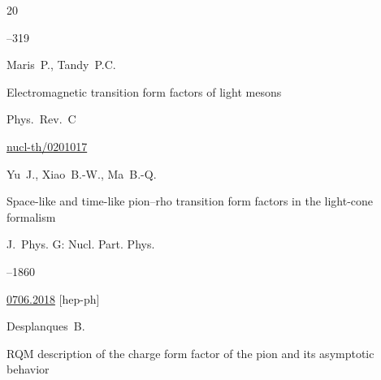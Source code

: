\begin{thebibliography}{20}



--319












\by Maris~P., Tandy~P.C.

\paper    Electromagnetic transition form factors of light mesons 

\jour Phys.~Rev.~C






\arxiv \href{http://arxiv.org/abs/nucl-th/0201017}{nucl-th/0201017}




\by Yu~J., Xiao~B.-W.,  Ma~B.-Q.

\paper  Space-like and time-like pion–rho transition form factors in the light-cone formalism 

\jour J.~Phys. G: Nucl. Part. Phys. 




--1860

\arxiv \href{http://arxiv.org/abs/0706.2018}{0706.2018} [hep-ph]





\by Desplanques~B.

\paper   RQM description of the charge form factor of the pion and its asymptotic behavior


\end{thebibliography}
